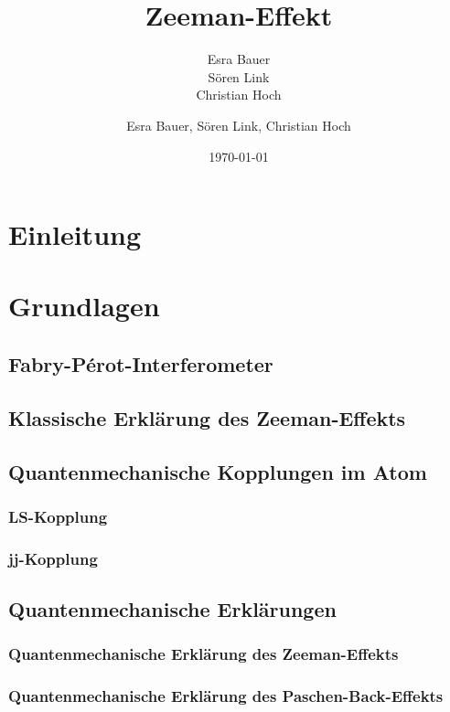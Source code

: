 \documentclass[bigchapter,colorback,accentcolor=tud4b,linedtoc,11pt]{tudreport}
\title{Zeeman-Effekt}
\subtitle{Esra Bauer  \\Sören Link \\Christian Hoch}
\author{Esra Bauer, Sören Link, Christian Hoch}
\date{\today}
\begin{document}

\maketitle

\tableofcontents


\chapter{Einleitung}

\chapter{Grundlagen}
\section{Fabry-Pérot-Interferometer}


\section{Klassische Erklärung des Zeeman-Effekts}
\section{Quantenmechanische Kopplungen im Atom}
\subsection{LS-Kopplung}
\subsection{jj-Kopplung}
\section{Quantenmechanische Erklärungen}
\subsection{Quantenmechanische Erklärung des Zeeman-Effekts}
\subsection{Quantenmechanische Erklärung des Paschen-Back-Effekts}
\end{document}
